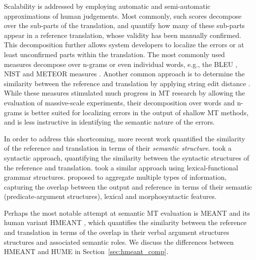 \documentclass[11pt]{article}
\newcommand{\secref}[1]{Section~\ref{#1}}
\def\parcite#1{\cite{#1}}
\begin{document}
Scalability is addressed by employing automatic and semi-automatic approximations of human
judgements. Most commonly, such scores decompose over the sub-parts of
the translation, and quantify how many of these sub-parts appear in a reference translation,
whose validity has been manually confirmed. This decomposition further allows system developers
to localize the errors or at least unconfirmed parts within the translation.
The most commonly used measures decompose over n-grams or even individual words, e.g., 
the BLEU \cite{Papineni:2002}, NIST \cite{Doddington:2002} and METEOR measures \cite{Banerjee:2005}.
Another common approach is to determine the similarity between the reference and translation
by applying string edit distance \cite{snover2006study}.
While these measures stimulated much progress in MT research by allowing
the evaluation of massive-scale experiments,
their decomposition over words and n-grams is better suited for localizing errors
in the output of shallow MT methods, and is less instructive in identifying the semantic
nature of the errors. 


In order to address this shortcoming, more recent work quantified
the similarity of the reference and translation in terms
of their {\it semantic structure}.  took a syntactic approach, 
quantifying the similarity between the syntactic structures of the reference and translation.
 took a similar approach using lexical-functional grammar structures.
 proposed to aggregate multiple types of information,
capturing the overlap between the output and reference in terms of their
semantic (predicate-argument structures), lexical and morphosyntactic features.

Perhaps the most notable attempt at semantic MT evaluation is MEANT and
its human variant HMEANT \parcite{lo2011structured}, which quantifies the similarity between
the reference and translation in terms of the overlap in
their verbal argument structures structures and associated semantic roles.
We discuss the differences between HMEANT and HUME in \secref{sec:hmeant_comp}.
\end{document}
